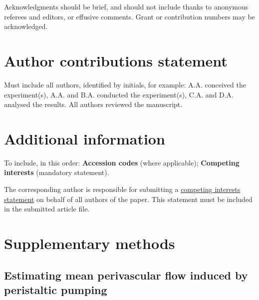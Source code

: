 \documentclass[fleqn,10pt]{wlscirep}
\begin{document}
Acknowledgments should be brief, and should not include thanks to anonymous referees and editors, or effusive comments. Grant or contribution numbers may be acknowledged.

\section*{Author contributions statement}

Must include all authors, identified by initials, for example:
A.A. conceived the experiment(s),  A.A. and B.A. conducted the experiment(s), C.A. and D.A. analysed the results.  All authors reviewed the manuscript. 

\section*{Additional information}

To include, in this order: \textbf{Accession codes} (where applicable); \textbf{Competing interests} (mandatory statement). 

The corresponding author is responsible for submitting a \href{http://www.nature.com/srep/policies/index.html#competing}{competing interests statement} on behalf of all authors of the paper. This statement must be included in the submitted article file.


\newpage
\appendix

\section{Supplementary methods}

\subsection{Estimating mean perivascular flow induced by peristaltic pumping}

\label{sec:sup:peristalsis}
\end{document}
